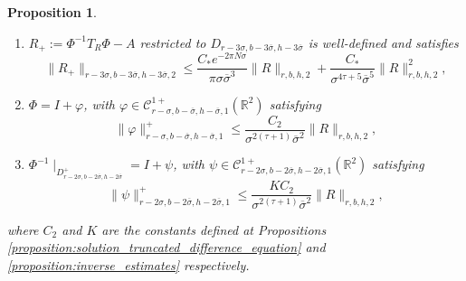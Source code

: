 \documentclass[10pt]{article}
\newtheorem{proposition}[theorem]{Proposition}
\newcommand{\R}{\mathbb{R}}
\newcommand{\Domain}[3]{D_{#1, #2, #3}}
\newcommand{\DomainP}[3]{D_{#1, #2, #3}^+}
\begin{document}
\begin{proposition}
\begin{enumerate}
\item $R_+ := \Phi^{-1} T_R\Phi - A$ restricted to $\Domain{r-3\sigma}{b-3\overline\sigma}{h-3\overline\sigma}$ %
is well-defined and satisfies
 \[
 \|R_+\|_{r-3\sigma,b-3\overline\sigma,h-3\overline\sigma,2}
 \leq \frac{C_\ast e^{-2\pi N\sigma}}{\pi\sigma\overline \sigma^3} \|R\|_{r,b,h,2} + \frac{C_\ast}{\sigma^{4\tau+5}\overline\sigma^5}\|R\|_{r,b,h,2}^2,
 \]
 \item  $\Phi=I+\varphi$, with $\varphi \in \mathscr C^{1+}_{r-\sigma,b-\overline\sigma,h-\overline\sigma, 1}(\R^2)$ satisfying
 \[
 \|\varphi\|_{r-\sigma,b-\overline\sigma,h-\overline\sigma,1}^+
 \leq 
 \frac{C_2}{\sigma^{2(\tau+1)}\overline\sigma^2}\|R\|_{r,b,h,2},
 \]
 \item $\Phi^{-1}\mid_{\DomainP{r-2\sigma}{b-2\overline\sigma}{h-2\overline\sigma}} = I+\psi$, with  $\psi \in \mathscr C^{1+}_{r-2\sigma,b-2\overline\sigma,h-2\overline\sigma, 1}(\R^2)$ satisfying
 \[
 \|\psi\|^+_{r-2\sigma,b-2\overline\sigma,h-2\overline\sigma,1} 
 \leq 
 \frac{KC_2}{\sigma^{2(\tau+1)}\overline\sigma^2}\|R\|_{r,b,h,2},
 \]
\end{enumerate}
 where $C_2$ and $K$ are the constants defined at Propositions \ref{proposition:solution_truncated_difference_equation} and \ref{proposition:inverse_estimates} respectively.
\end{proposition}
\end{document}
